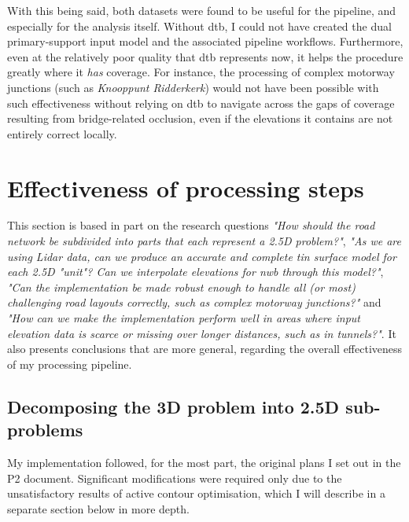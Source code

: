 With this being said, both datasets were found to be useful for the pipeline, and especially for the analysis itself. Without \ac{dtb}, I could not have created the dual primary-support input model and the associated pipeline workflows. Furthermore, even at the relatively poor quality that \ac{dtb} represents now, it helps the procedure greatly where it \textit{has} coverage. For instance, the processing of complex motorway junctions (such as \textit{Knooppunt Ridderkerk}) would not have been possible with such effectiveness without relying on \ac{dtb} to navigate across the gaps of coverage resulting from bridge-related occlusion, even if the elevations it contains are not entirely correct locally.

\section{Effectiveness of processing steps}
\label{sec:effectiveness}

This section is based in part on the research questions \textit{"How should the road network be subdivided into parts that each represent a 2.5D problem?"}, \textit{"As we are using Lidar data, can we produce an accurate and complete \ac{tin} surface model for each 2.5D "unit"? Can we interpolate elevations for \ac{nwb} through this model?"}, \textit{"Can the implementation be made robust enough to handle all (or \textit{most}) challenging road layouts correctly, such as complex motorway junctions?"} and \textit{"How can we make the implementation perform well in areas where input elevation data is scarce or missing over longer distances, such as in tunnels?"}. It also presents conclusions that are more general, regarding the overall effectiveness of my processing pipeline.

\subsection{Decomposing the 3D problem into 2.5D sub-problems}
\label{sub:effectivenessdecomposition}

My implementation followed, for the most part, the original plans I set out in the P2 document. Significant modifications were required only due to the unsatisfactory results of active contour optimisation, which I will describe in a separate section below in more depth.

